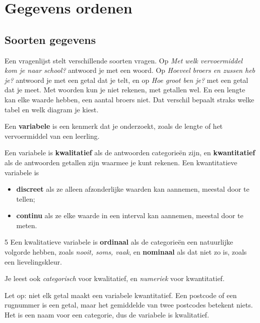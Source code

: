 \section{Gegevens ordenen}

\subsection{Soorten gegevens}

Een vragenlijst stelt verschillende soorten vragen. Op \textit{Met welk vervoermiddel kom je naar school?} antwoord je met een woord. Op \textit{Hoeveel broers en zussen heb je?} antwoord je met een getal dat je telt, en op \textit{Hoe groot ben je?} met een getal dat je meet. Met woorden kun je niet rekenen, met getallen wel. En een lengte kan elke waarde hebben, een aantal broers niet. Dat verschil bepaalt straks welke tabel en welk diagram je kiest.

\begin{theorie}
Een \textbf{\textcolor{accent}{variabele}} is een kenmerk dat je onderzoekt, zoals de lengte of het vervoermiddel van een leerling.

\vspace{1mm}
Een variabele is \textbf{\textcolor{accent}{kwalitatief}} als de antwoorden categorieën zijn, en \textbf{\textcolor{accent}{kwantitatief}} als de antwoorden getallen zijn waarmee je kunt rekenen. Een kwantitatieve variabele is
\begin{itemize}
  \item \textbf{\textcolor{accent}{discreet}} als ze alleen afzonderlijke waarden kan aannemen, meestal door te tellen;
  \item \textbf{\textcolor{accent}{continu}} als ze elke waarde in een interval kan aannemen, meestal door te meten.
\end{itemize}
\begin{alleenvoor}{5}
Een kwalitatieve variabele is \textbf{\textcolor{accent}{ordinaal}} als de categorieën een natuurlijke volgorde hebben, zoals \textit{nooit, soms, vaak}, en \textbf{\textcolor{accent}{nominaal}} als dat niet zo is, zoals een lievelingskleur.
\end{alleenvoor}
\end{theorie}

Je leest ook \textit{categorisch} voor kwalitatief, en \textit{numeriek} voor kwantitatief.

Let op: niet elk getal maakt een variabele kwantitatief. Een postcode of een rugnummer is een getal, maar het gemiddelde van twee postcodes betekent niets. Het is een naam voor een categorie, dus de variabele is kwalitatief.

